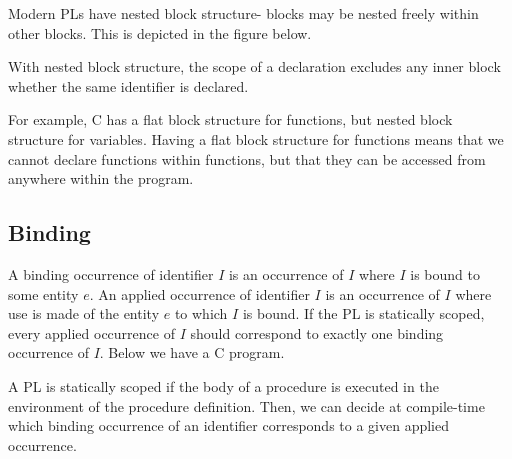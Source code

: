 \documentclass[a4paper, openany]{memoir}
\begin{document}
Modern PLs have nested block structure- blocks may be nested freely within other blocks. This is depicted in the figure below.
\begin{figure}[H]
    \centering
\end{figure}
\noindent With nested block structure, the scope of a declaration excludes any inner block whether the same identifier is declared.

For example, C has a flat block structure for functions, but nested block structure for variables. Having a flat block structure for functions means that we cannot declare functions within functions, but that they can be accessed from anywhere within the program.

\subsection{Binding}
A binding occurrence of identifier $I$ is an occurrence of $I$ where $I$ is bound to some entity $e$. An applied occurrence of identifier $I$ is an occurrence of $I$ where use is made of the entity $e$ to which $I$ is bound. If the PL is statically scoped, every applied occurrence of $I$ should correspond to exactly one binding occurrence of $I$. Below we have a C program.

A PL is statically scoped if the body of a procedure is executed in the environment of the procedure definition. Then, we can decide at compile-time which binding occurrence of an identifier corresponds to a given applied occurrence. 
\end{document}
